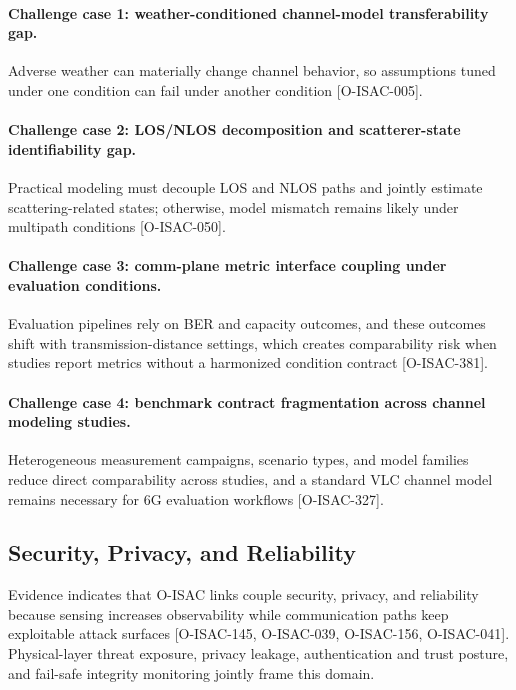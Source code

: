 \paragraph{Challenge case 1: weather-conditioned channel-model transferability gap.}
Adverse weather can materially change channel behavior, so assumptions tuned under one condition can fail under another condition [O-ISAC-005].

\paragraph{Challenge case 2: LOS/NLOS decomposition and scatterer-state identifiability gap.}
Practical modeling must decouple LOS and NLOS paths and jointly estimate scattering-related states; otherwise, model mismatch remains likely under multipath conditions [O-ISAC-050].

\paragraph{Challenge case 3: comm-plane metric interface coupling under evaluation conditions.}
Evaluation pipelines rely on BER and capacity outcomes, and these outcomes shift with transmission-distance settings, which creates comparability risk when studies report metrics without a harmonized condition contract [O-ISAC-381].

\paragraph{Challenge case 4: benchmark contract fragmentation across channel modeling studies.}
Heterogeneous measurement campaigns, scenario types, and model families reduce direct comparability across studies, and a standard VLC channel model remains necessary for 6G evaluation workflows [O-ISAC-327].

\subsection{Security, Privacy, and Reliability}

Evidence indicates that O-ISAC links couple security, privacy, and reliability because sensing increases observability while communication paths keep exploitable attack surfaces [O-ISAC-145, O-ISAC-039, O-ISAC-156, O-ISAC-041]. Physical-layer threat exposure, privacy leakage, authentication and trust posture, and fail-safe integrity monitoring jointly frame this domain.

